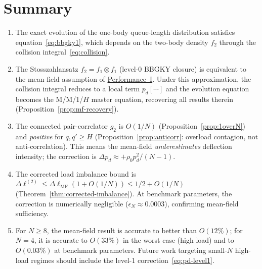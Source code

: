 \documentclass[11pt,a4paper]{report}
\newcommand{\pd}{p_d}
\newcommand{\fone}{f_1}
\newcommand{\ftwo}{f_2}
\newcommand{\gtwo}{g_2}
\begin{document}
\section{Summary}

\begin{enumerate}
  \item The exact evolution of the one-body queue-length distribution
        satisfies equation~\eqref{eq:bbgky1}, which depends on the
        two-body density $\ftwo$ through the collision integral~\eqref{eq:collision}.

  \item The Stosszahlansatz $\ftwo = \fone \otimes \fone$
        (level-0 BBGKY closure) is equivalent to the mean-field
        assumption of \hyperref[chap:load_balance]{Performance~I}.
        Under this approximation, the collision integral reduces to a
        local term $\pd[\cdots]$ and the evolution equation becomes
        the M/M/1/$H$ master equation, recovering all results therein
        (Proposition~\ref{prop:mf-recovery}).

  \item The connected pair-correlator $\gtwo$ is $O(1/N)$
        (Proposition~\ref{prop:1overN}) and \emph{positive} for
        $q, q' \geq H$ (Proposition~\ref{prop:anticorr}: overload
        contagion, not anti-correlation).
        This means the mean-field \emph{underestimates} deflection
        intensity; the correction is $\Delta\pd \approx +\rho_0\pd^2/(N-1)$.

  \item The corrected load imbalance bound is
        $\Delta\ell^{(2)} \leq \Delta\ell_{\mathrm{MF}}(1 + O(1/N)) \leq 1/2 + O(1/N)$
        (Theorem~\ref{thm:corrected-imbalance}).
        At benchmark parameters, the correction is numerically negligible
        ($\epsilon_N \approx 0.0003$), confirming mean-field sufficiency.

  \item For $N \geq 8$, the mean-field result is accurate to better than
        $O(12\%)$; for $N=4$, it is accurate to $O(33\%)$ in the worst case
        (high load) and to $O(0.03\%)$ at benchmark parameters.
        Future work targeting small-$N$ high-load regimes should include
        the level-1 correction~\eqref{eq:pd-level1}.
\end{enumerate}

\end{document}
